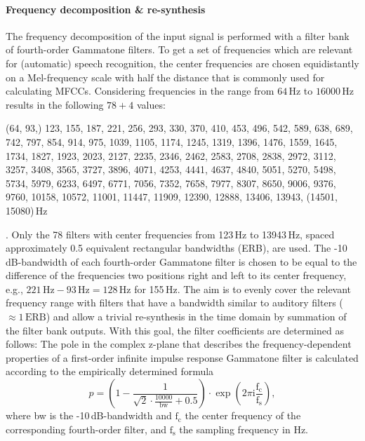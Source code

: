 \documentclass[10pt,a4paper,twocolumn]{article}
\begin{document}
\paragraph{Frequency decomposition \& re-synthesis}
%
The frequency decomposition of the input signal is performed with a filter bank of fourth-order Gammatone filters.
%
To get a set of frequencies which are relevant for (automatic) speech recognition, the center frequencies are chosen equidistantly on a Mel-frequency scale with half the distance that is commonly used for calculating MFCCs.
%
Considering frequencies in the range from $64\,\text{Hz}$ to $16000\,\text{Hz}$ results in the following $78+4$ values: \begin{footnotesize}(64, 93,) 123, 155, 187, 221, 256, 293, 330, 370, 410, 453, 496, 542, 589, 638, 689, 742, 797, 854, 914, 975, 1039, 1105, 1174, 1245, 1319, 1396, 1476, 1559, 1645, 1734, 1827, 1923, 2023, 2127, 2235, 2346, 2462, 2583, 2708, 2838, 2972, 3112, 3257, 3408, 3565, 3727, 3896, 4071, 4253, 4441, 4637, 4840, 5051, 5270, 5498, 5734, 5979, 6233, 6497, 6771, 7056, 7352, 7658, 7977, 8307, 8650, 9006, 9376, 9760, 10158, 10572, 11001, 11447, 11909, 12390, 12888, 13406, 13943, (14501, 15080)\,Hz\end{footnotesize}.
%
Only the 78 filters with center frequencies from 123\,Hz to 13943\,Hz, spaced approximately 0.5 equivalent rectangular bandwidths (ERB), are used.
%
The -10\,dB-bandwidth of each fourth-order Gammatone filter is chosen to be equal to the difference of the frequencies two positions right and left to its center frequency, e.g., $221\,\text{Hz}-93\,\text{Hz}=128\,\text{Hz}$ for 155\,Hz.
%
The aim is to evenly cover the relevant frequency range with filters that have a bandwidth similar to auditory filters ($\approx1\,\text{ERB}$) and allow a trivial re-synthesis in the time domain by summation of the filter bank outputs.
%
With this goal, the filter coefficients are determined as follows:
%	
The pole in the complex z-plane that describes the frequency-dependent properties of a first-order infinite impulse response Gammatone filter is calculated according to the empirically determined formula
\begin{equation}
p = \left(1-\frac{1}{\sqrt{2} \cdot \frac{10000}{\text{bw}} + 0.5}\right) \cdot \exp\left(2\pi \text{i} \frac{\text{f}_\text{c}}{\text{f}_\text{s}}\right),
\end{equation}
%
where bw is the -10\,dB-bandwidth and $\text{f}_\text{c}$ the center frequency of the corresponding fourth-order filter, and $\text{f}_\text{s}$ the sampling frequency in Hz.
\end{document}
